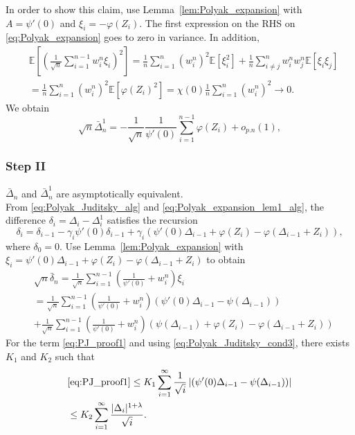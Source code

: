 \documentclass[letterpaper, 11pt]{IEEEtran}      %
\newcommand{\ex}[1]{\ensuremath{\mathbb{E}\left[ #1\right]}}
\begin{document}
{In order to show this claim, use Lemma~\ref{lem:Polyak_expansion} with $A = \psi'(0)$ and $\xi_i = -\varphi(Z_i)$. The first expression on the RHS on \eqref{eq:Polyak_expansion} goes to zero in variance. In addition, 
\begin{align*}
& \ex{ \left( \frac{1}{\sqrt{n}} \sum_{i=1}^{n-1} w_i^n \xi_i \right)^2 }  = \frac{1}{n}  \sum_{i=1}^n (w_i^n)^2 \ex{ \xi_i^2} + \frac{1}{n}  \sum_{i\neq j}^n w_i^n w_j^n \ex{ \xi_i \xi_j} \\
& = \frac{1}{n}  \sum_{i=1}^n (w_i^n)^2 \ex{ \varphi(Z_i)^2} = \chi(0) \frac{1}{n}  \sum_{i=1}^n (w_i^n)^2 \to 0. 
\end{align*}
We obtain
\begin{equation}
\sqrt{n} \bar{\Delta}^1_n = -\frac{1}{\sqrt{n}} \frac{1}{\psi'(0)} \sum_{i=1}^{n-1} \varphi(Z_i)+ o_{p.n}(1), \label{eq:Polyak_expansion_aux_process}
\end{equation}

\subsubsection*{Step II} $\bar{\Delta}_n$ and $\bar{\Delta}^1_n$ are asymptotically equivalent. \\

From \eqref{eq:Polyak_Juditsky_alg} and \eqref{eq:Polyak_expansion_lem1_alg}, the difference $\delta_i = \Delta_i - \Delta_i^1$ satisfies the recursion
\[
\delta_i = \delta_{i-1} - \gamma_i \psi'(0) \delta_{i-1} + \gamma_i \left( \psi'(0) \Delta_{i-1}  + \varphi(Z_i) - \varphi(\Delta_{i-1} + Z_i) \right),
\]
where $\delta_0 = 0$. Use Lemma~\ref{lem:Polyak_expansion} with $\xi_i =  \psi'(0) \Delta_{i-1}  + \varphi(Z_i) - \varphi(\Delta_{i-1} + Z_i)$ to obtain
\begin{align}
& \sqrt{n}\bar{\delta}_n = \frac{1}{\sqrt{n}} \sum_{i=1}^{n-1} \left( \frac{1}{\psi'(0)}  + w_i^n \right)  \xi_i  \\
& = \frac{1}{\sqrt{n}} \sum_{i=1}^{n-1} \left( \frac{1}{\psi'(0)}  + w_i^n \right)  \left( \psi'(0) \Delta_{i-1}  - \psi(\Delta_{i-1}) \right) \label{eq:PJ_proof1} \\
& + 
\frac{1}{\sqrt{n}} \sum_{i=1}^{n-1} \left( \frac{1}{\psi'(0)}  + w_i^n \right)  \left( \psi(\Delta_{i-1})  + \varphi(Z_i) - \varphi(\Delta_{i-1}+Z_i)
\right) \label{eq:PJ_proof2}
\end{align}
For the term \eqref{eq:PJ_proof1} and using \eqref{eq:Polyak_Juditsky_cond3}, there exists $K_1$ and $K_2$ such that 
\begin{align*}
& \eqref{eq:PJ_proof1}
\leq K_1 \sum_{i=1}^\infty \frac{1}{\sqrt{i}} \left| \left( \psi'(0) \Delta_{i-1}  - \psi(\Delta_{i-1}) \right) \right| \\
& \leq K_2 \sum_{i=1}^\infty \frac{ |\Delta_i|^{1+\lambda}}{\sqrt{i}}. 
\end{align*}

}
\end{document}

